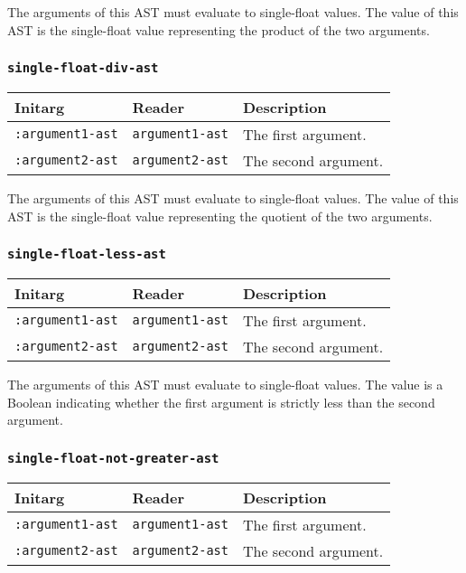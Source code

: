 The arguments of this AST must evaluate to single-float
values.  The value of this AST is the single-float value
representing the product of the two arguments.

\subsubsection{\texttt{single-float-div-ast}}
\label{sec-ast-single-float-div}

\begin{tabular}{|l|l|l|}
\hline
Initarg & Reader & Description\\
\hline\hline
\texttt{:argument1-ast} & \texttt{argument1-ast} & The first argument.\\
\hline
\texttt{:argument2-ast} & \texttt{argument2-ast} & The second argument.\\
\hline
\end{tabular}

The arguments of this AST must evaluate to single-float
values.  The value of this AST is the single-float value
representing the quotient of the two arguments.

\subsubsection{\texttt{single-float-less-ast}}
\label{sec-ast-single-float-less}

\begin{tabular}{|l|l|l|}
\hline
Initarg & Reader & Description\\
\hline\hline
\texttt{:argument1-ast} & \texttt{argument1-ast} & The first argument.\\
\hline
\texttt{:argument2-ast} & \texttt{argument2-ast} & The second argument.\\
\hline
\end{tabular}

The arguments of this AST must evaluate to single-float
values.  The value is a Boolean indicating whether the first argument
is strictly less than the second argument.

\subsubsection{\texttt{single-float-not-greater-ast}}
\label{sec-ast-single-float-not-greater}

\begin{tabular}{|l|l|l|}
\hline
Initarg & Reader & Description\\
\hline\hline
\texttt{:argument1-ast} & \texttt{argument1-ast} & The first argument.\\
\hline
\texttt{:argument2-ast} & \texttt{argument2-ast} & The second argument.\\
\hline
\end{tabular}

